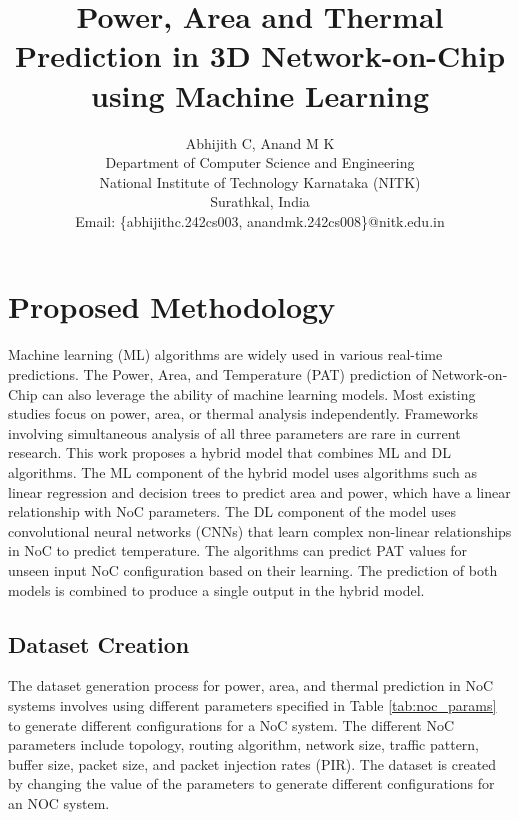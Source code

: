 \documentclass[conference]{IEEEtran}
\begin{document}
\title{Power, Area and Thermal Prediction in 3D Network-on-Chip using Machine Learning}

\author{Abhijith C, Anand M K \\

Department of Computer Science and Engineering \\ 
	National Institute of Technology Karnataka (NITK) \\ 
	Surathkal, India\\
Email: \{abhijithc.242cs003, anandmk.242cs008\}@nitk.edu.in}


\maketitle

\section{Proposed Methodology}

Machine learning (ML) algorithms are widely used in various real-time predictions. The Power, Area, and Temperature (PAT) prediction of Network-on-Chip can also leverage the ability of machine learning models. Most existing studies focus on power, area, or thermal analysis independently. Frameworks involving simultaneous analysis of all three parameters are rare in current research. This work proposes a hybrid model that combines ML and DL algorithms. The ML component of the hybrid model uses algorithms such as linear regression and decision trees to predict area and power, which have a linear relationship with NoC parameters. The DL component of the model uses convolutional neural networks (CNNs) that learn complex non-linear relationships in NoC to predict temperature. The algorithms can predict PAT values for unseen input NoC configuration based on their learning. The prediction of both models is combined to produce a single output in the hybrid model.

\subsection{Dataset Creation}

The dataset generation process for power, area, and thermal prediction in NoC systems involves using different parameters specified in Table \ref{tab:noc_params} to generate different configurations for a NoC system. The different NoC parameters include topology, routing algorithm, network size, traffic pattern, buffer size, packet size, and packet injection rates (PIR). The dataset is created by changing the value of the parameters to generate different configurations for an NOC system.
\end{document}
